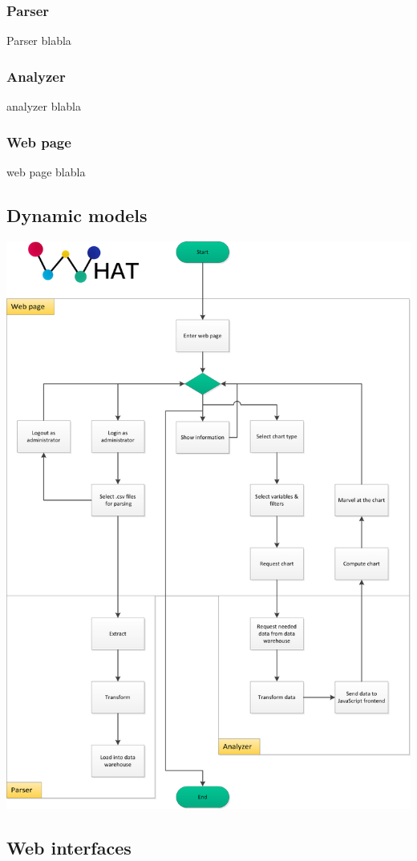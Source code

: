\subsubsection{Parser}
Parser blabla
\subsubsection{Analyzer}
analyzer blabla
\subsubsection{Web page}
web page blabla

\newpage
\subsection{Dynamic models}
\begin{center}
\includegraphics[width=0.8\linewidth]{Pictures/Flow1.png}
\end{center} 

\newpage
\subsection{Web interfaces}
